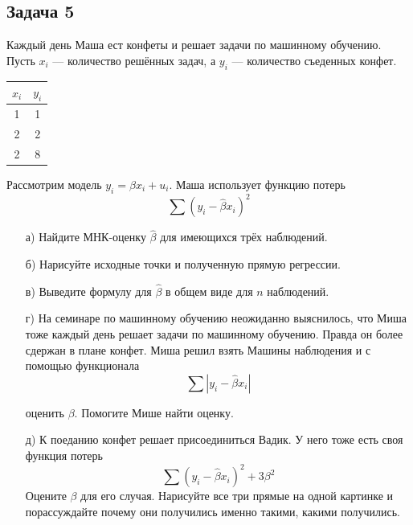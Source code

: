 \documentclass[12pt, a4paper, oneside]{article}
\begin{document}
\subsection*{Задача 5}

Каждый день Маша ест конфеты и решает задачи по машинному обучению. Пусть $x_i$ — количество решённых задач, а $y_i$ — количество съеденных конфет.

\begin{center}
\begin{tabular}{c|c}
	\hline
	$x_i$ & $y_i$ \\
	\hline
	1 & 1 \\
	2 & 2 \\
	2 & 8 \\
\end{tabular}
\end{center}

Рассмотрим модель $y_i = \beta x_i + u_i$. Маша использует функцию потерь 
\[
\sum (y_i - \hat \beta x_i )^2
\]

\begin{enumerate}
	\item[а)] Найдите МНК-оценку $\hat \beta$ для имеющихся трёх наблюдений.
	\item[б)] Нарисуйте исходные точки и полученную прямую
	регрессии.
	\item[в)] Выведите формулу для $\hat \beta$ в общем виде для $n$ наблюдений.
	\item[г)] На семинаре по машинному обучению неожиданно выяснилось, что Миша тоже каждый день решает задачи по машинному обучению. Правда он более сдержан в плане конфет. Миша решил взять Машины наблюдения и с помощью функционала 
	\[
	\sum |y_i - \hat \beta x_i |
	\]  
	
	оценить $\beta$. Помогите Мише найти оценку. 
	\item[д)] К поеданию конфет решает присоединиться Вадик. У него тоже есть своя функция потерь
	\[
	\sum (y_i - \hat \beta x_i)^2 + 3\beta^2
	\]  	
	Оцените $\beta$ для его случая. Нарисуйте все три прямые на одной картинке и порассуждайте почему они получились именно такими, какими получились. 
\end{enumerate}
\end{document}

